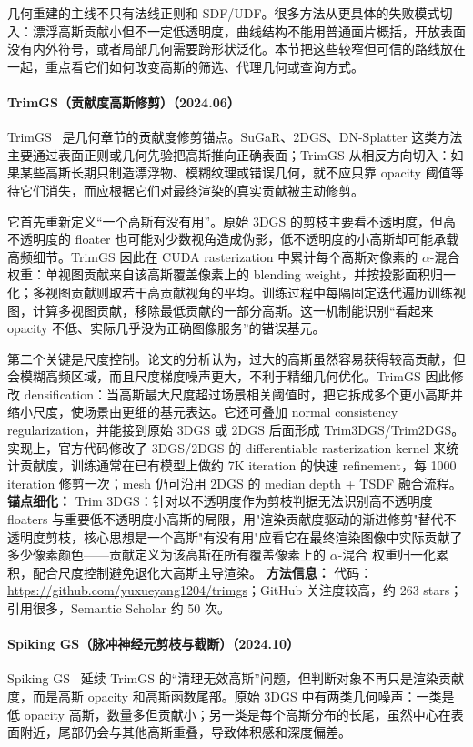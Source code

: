 几何重建的主线不只有法线正则和 SDF/UDF。很多方法从更具体的失败模式切入：漂浮高斯贡献小但不一定低透明度，曲线结构不能用普通面片概括，开放表面没有内外符号，或者局部几何需要跨形状泛化。本节把这些较窄但可信的路线放在一起，重点看它们如何改变高斯的筛选、代理几何或查询方式。



\paragraph{TrimGS（贡献度高斯修剪）（2024.06）}
TrimGS~\cite{2406_07499} 是几何章节的贡献度修剪锚点。SuGaR、2DGS、DN-Splatter 这类方法主要通过表面正则或几何先验把高斯推向正确表面；TrimGS 从相反方向切入：如果某些高斯长期只制造漂浮物、模糊纹理或错误几何，就不应只靠 opacity 阈值等待它们消失，而应根据它们对最终渲染的真实贡献被主动修剪。

它首先重新定义“一个高斯有没有用”。原始 3DGS 的剪枝主要看不透明度，但高不透明度的 floater 也可能对少数视角造成伪影，低不透明度的小高斯却可能承载高频细节。TrimGS 因此在 CUDA rasterization 中累计每个高斯对像素的 $\alpha$-混合权重：单视图贡献来自该高斯覆盖像素上的 blending weight，并按投影面积归一化；多视图贡献则取若干高贡献视角的平均。训练过程中每隔固定迭代遍历训练视图，计算多视图贡献，移除最低贡献的一部分高斯。这一机制能识别“看起来 opacity 不低、实际几乎没为正确图像服务”的错误基元。

第二个关键是尺度控制。论文的分析认为，过大的高斯虽然容易获得较高贡献，但会模糊高频区域，而且尺度梯度噪声更大，不利于精细几何优化。TrimGS 因此修改 densification：当高斯最大尺度超过场景相关阈值时，把它拆成多个更小高斯并缩小尺度，使场景由更细的基元表达。它还可叠加 normal consistency regularization，并能接到原始 3DGS 或 2DGS 后面形成 Trim3DGS/Trim2DGS。实现上，官方代码修改了 3DGS/2DGS 的 differentiable rasterization kernel 来统计贡献度，训练通常在已有模型上做约 7K iteration 的快速 refinement，每 1000 iteration 修剪一次；mesh 仍可沿用 2DGS 的 median depth + TSDF 融合流程。
\textbf{锚点细化：} Trim 3DGS：针对以不透明度作为剪枝判据无法识别高不透明度 floaters 与重要低不透明度小高斯的局限，用"渲染贡献度驱动的渐进修剪"替代不透明度剪枝，核心思想是一个高斯"有没有用"应看它在最终渲染图像中实际贡献了多少像素颜色——贡献定义为该高斯在所有覆盖像素上的 $\alpha$-混合 权重归一化累积，配合尺度控制避免退化大高斯主导渲染。
\textbf{方法信息：} 代码：\url{https://github.com/yuxueyang1204/trimgs}；GitHub 关注度较高，约 263 stars；引用很多，Semantic Scholar 约 50 次。



\paragraph{Spiking GS（脉冲神经元剪枝与截断）（2024.10）}
Spiking GS~\cite{2410_07266} 延续 TrimGS 的“清理无效高斯”问题，但判断对象不再只是渲染贡献度，而是高斯 opacity 和高斯函数尾部。原始 3DGS 中有两类几何噪声：一类是低 opacity 高斯，数量多但贡献小；另一类是每个高斯分布的长尾，虽然中心在表面附近，尾部仍会与其他高斯重叠，导致体积感和深度偏差。

